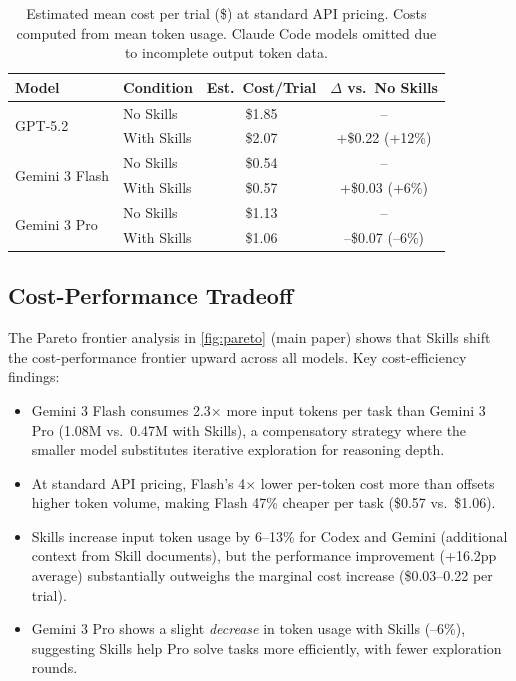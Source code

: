 \begin{table}[htb]
\centering
\small
\caption{Estimated mean cost per trial (\$) at standard API pricing. Costs computed from mean token usage. Claude Code models omitted due to incomplete output token data.}
\label{tab:cost-per-trial}
\begin{tabular}{llcc}
\toprule
\textbf{Model} & \textbf{Condition} & \textbf{Est.\ Cost/Trial} & \textbf{$\Delta$ vs.\ No Skills} \\
\midrule
\multirow{2}{*}{GPT-5.2} & No Skills & \$1.85 & -- \\
& With Skills & \$2.07 & +\$0.22 (+12\%) \\
\midrule
\multirow{2}{*}{Gemini 3 Flash} & No Skills & \$0.54 & -- \\
& With Skills & \$0.57 & +\$0.03 (+6\%) \\
\midrule
\multirow{2}{*}{Gemini 3 Pro} & No Skills & \$1.13 & -- \\
& With Skills & \$1.06 & --\$0.07 (--6\%) \\
\bottomrule
\end{tabular}
\end{table}

\subsection{Cost-Performance Tradeoff}

The Pareto frontier analysis in \autoref{fig:pareto} (main paper) shows that Skills shift the cost-performance frontier upward across all models. Key cost-efficiency findings:
\begin{itemize}[nosep]
\item Gemini 3 Flash consumes 2.3$\times$ more input tokens per task than Gemini 3 Pro (1.08M vs.\ 0.47M with Skills), a compensatory strategy where the smaller model substitutes iterative exploration for reasoning depth.
\item At standard API pricing, Flash's 4$\times$ lower per-token cost more than offsets higher token volume, making Flash 47\% cheaper per task (\$0.57 vs.\ \$1.06).
\item Skills increase input token usage by 6--13\% for Codex and Gemini (additional context from Skill documents), but the performance improvement (+16.2pp average) substantially outweighs the marginal cost increase (\$0.03--0.22 per trial).
\item Gemini 3 Pro shows a slight \emph{decrease} in token usage with Skills (--6\%), suggesting Skills help Pro solve tasks more efficiently, with fewer exploration rounds.
\end{itemize}

